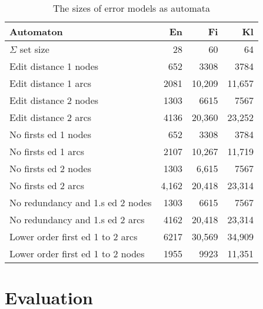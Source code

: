 \documentclass[11pt]{article}
\begin{document}
\begin{table}[h]
\begin{center}
\begin{scriptsize}
\begin{tabular}{|l|rrr|}
\hline
\bf Automaton & \bf En & \bf Fi & \bf Kl  \\ 
\hline
$\Sigma$ set size &
 28& 60& 64
\\
Edit distance 1 nodes &
 652& 3308& 3784
\\
Edit distance 1 arcs &
 2081& 10,209& 11,657
\\
Edit distance 2 nodes &
 1303& 6615& 7567
\\
Edit distance 2 arcs &
 4136& 20,360& 23,252
\\
No firsts ed 1 nodes & 
 652& 3308& 3784
\\
No firsts ed 1 arcs & 
 2107& 10,267& 11,719
\\
No firsts ed 2 nodes &
 1303& 6,615& 7567
\\
No firsts ed 2 arcs &
 4,162& 20,418& 23,314
\\
No redundancy and 1.s ed 2 nodes &
 1303& 6615& 7567
\\
No redundancy and 1.s ed 2 arcs &
 4162& 20,418& 23,314
\\
Lower order first ed 1 to 2 arcs &
6217 & 30,569 & 34,909
\\
Lower order first ed 1 to 2 nodes &
1955 & 9923 & 11,351
\\
\hline
\end{tabular}
\end{scriptsize}
\end{center}
\caption{\label{table:error-sizes}
The sizes of error models as automata}
\end{table}


\section{Evaluation}
\label{sec:evaluation}
\end{document}
